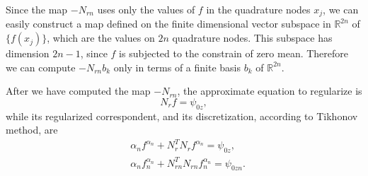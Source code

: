 \documentclass[10pt, a4paper, twoside, openright]{book}
\theoremstyle{definition}
\theoremstyle{plain}
\theoremstyle{plain}
\theoremstyle{plain}
\theoremstyle{plain}
\theoremstyle{plain}
\theoremstyle{plain}
\theoremstyle{plain}
\theoremstyle{plain}
\let\phi\varphi
\begin{document}
Since the map $-N_{rn}$ uses only the values of $f$ in the quadrature nodes $x_j$, we can easily 
construct a map defined on the finite dimensional vector subspace in $\mathbb{R}^{2n}$ of 
$\{f(x_j)\}$, which are the values on $2n$ quadrature nodes. This subspace has dimension $2n-1$, 
since $f$ is subjected to the constrain of zero mean. Therefore we can compute $-N_{rn}b_k$ 
only in terms of a finite basis $b_k$ of $\mathbb{R}^{2n}$.
% 
\par
After we have computed the map $-N_{rn}$, 
the approximate equation to regularize is
\begin{equation}
 N_r f = \psi_{0z},
\end{equation}
while its regularized correspondent, and its discretization, according to Tikhonov method, are
\begin{align}
 &\alpha_n f^{\alpha_n} + N_r^TN_rf^{\alpha_n} = \psi_{0z}\label{eq:tikh-reg-lsm}, \\
 &\alpha_n f_n^{\alpha_n} + N_{rn}^TN_{rn}f_n^{\alpha_n} = \psi_{0zn}\label{eq:tikh-reg-lsm-discrete}.
\end{align}
\end{document}

